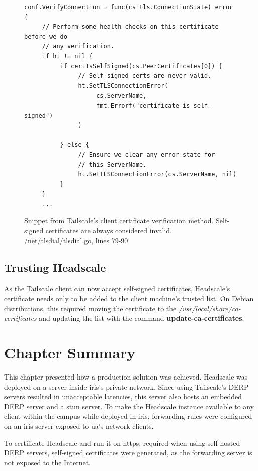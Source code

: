 \documentclass[11pt,twoside,a4paper]{report}
\begin{document}
\begin{figure}
\centering
\begin{lstlisting}
conf.VerifyConnection = func(cs tls.ConnectionState) error {
     // Perform some health checks on this certificate before we do
     // any verification.
     if ht != nil {
          if certIsSelfSigned(cs.PeerCertificates[0]) {
               // Self-signed certs are never valid.
               ht.SetTLSConnectionError(
                    cs.ServerName,
                    fmt.Errorf("certificate is self-signed")
               )

          } else {
               // Ensure we clear any error state for
               // this ServerName.
               ht.SetTLSConnectionError(cs.ServerName, nil)
          }
     }
     ...
\end{lstlisting}
\label{fig:tscert}
\caption{Snippet from Tailscale's client certificate verification method. Self-signed certificates are always considered invalid. /net/tlsdial/tlsdial.go, lines 79-90 }
\end{figure}
\fi

\subsection{Trusting Headscale}

As the Tailscale client can now accept self-signed certificates, Headscale's certificate needs only to be added to the client machine's trusted list. On Debian distributions, this required moving the certificate to the \emph{/usr/local/share/ca-certificates} and updating the list with the command \textbf{update-ca-certificates}.

\section{Chapter Summary}

This chapter presented how a production solution was achieved. Headscale was deployed on a server inside \ac{iris}'s private network. Since using Tailscale's \ac{DERP} servers resulted in unacceptable latencies, this server also hosts an embedded \ac{DERP} server and a \ac{stun} server. To make the Headscale instance available to any client within the campus while deployed in \ac{iris}, forwarding rules were configured on an \ac{iris} server exposed to \ac{ua}'s network clients.

To certificate Headscale and run it on \ac{https}, required when using self-hosted \ac{DERP} servers, self-signed certificates were generated, as the forwarding server is not exposed to the Internet.
\end{document}
